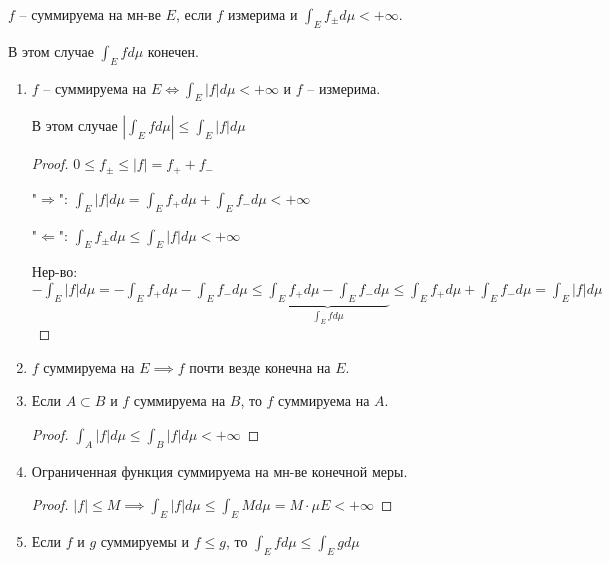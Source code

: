 \begin{definition}
    $f$ -- суммируема на мн-ве $E$, если $f$ измерима и $\int_E{f_{\pm} d \mu} < +\infty$.    
\end{definition}
\begin{remark}
    В этом случае $\int_E{f d \mu}$ конечен.
\end{remark}
\begin{properties}
    \begin{enumerate}
        \item {
            $f$ -- суммируема на $E \Leftrightarrow \int_E{|f| d \mu} < +\infty$ и $f$ -- измерима.

            В этом случае $|\int_E{f d \mu}| \leq \int_E{|f| d \mu}$

            \begin{proof}
                $0 \leq f_{\pm} \leq |f| = f_+ + f_-$

                "$\Rightarrow$":  $\int_E{|f| d \mu} = \int_E{f_+ d \mu} + \int_E{f_- d \mu} < +\infty$

                "$\Leftarrow$": $\int_E{f_{\pm} d \mu} \leq \int_{E}{|f|d \mu} < +\infty$


                Нер-во: $-\int_E{|f| d \mu} = -\int_E{f_+ d \mu} - \int_E{f_- d \mu} \leq \underbrace{\int_E{f_+ d \mu} - \int_E{f_- d \mu}}_{\int_E{f d \mu}} \leq \int_E{f_+ d \mu} + \int_E{f_- d \mu} = \int_E{|f| d \mu}$
            \end{proof}
        }
        \item {
            $f$ суммируема на $E \implies f$ почти везде конечна на $E$.
        }
        \item {
            Если $A \subset B$ и $f$ суммируема на $B$, то $f$ суммируема на $A$.

            \begin{proof}
                $\int_A{|f| d \mu} \leq \int_B{|f| d \mu} < +\infty$
            \end{proof}
        }
        \item {
            Ограниченная функция суммируема на мн-ве конечной меры.

            \begin{proof}
                $|f| \leq M \implies \int_E{|f| d \mu}  \leq \int_E{M d \mu} = M \cdot \mu E < +\infty$
            \end{proof}
        }
        \item {
            Если $f$ и $g$ суммируемы и $f \leq g$, то $\int_E{f d \mu} \leq \int_E{g d \mu}$

}
\end{enumerate}
\end{properties}
